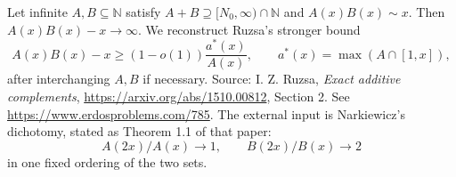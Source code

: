 Let infinite \(A,B\subseteq\mathbb N\) satisfy
\(A+B\supseteq[N_0,\infty)\cap\mathbb N\) and
\(A(x)B(x)\sim x\). Then \(A(x)B(x)-x\longrightarrow\infty\).
We reconstruct Ruzsa's stronger bound
\[
 A(x)B(x)-x\geq(1-o(1))\frac{a^*(x)}{A(x)},\qquad
 a^*(x)=\max(A\cap[1,x]),
                                                               \tag{1}
\]
after interchanging \(A,B\) if necessary.
Source: I. Z. Ruzsa, \emph{Exact additive complements},
\url{https://arxiv.org/abs/1510.00812}, Section 2.
See \url{https://www.erdosproblems.com/785}.
The external input is Narkiewicz's dichotomy, stated as
Theorem 1.1 of that paper:
\[
 A(2x)/A(x)\to1,\qquad B(2x)/B(x)\to2
                                                               \tag{2}
\]
in one fixed ordering of the two sets.
